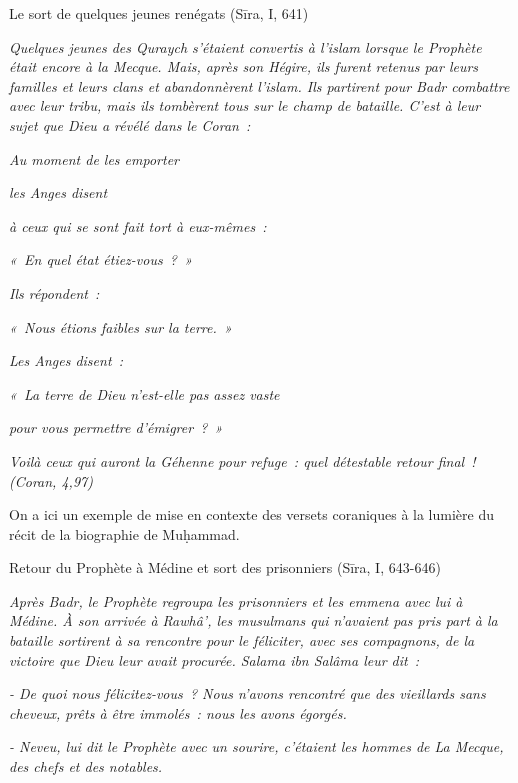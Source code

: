 Le sort de quelques jeunes renégats (Sīra, I, 641)

\emph{Quelques jeunes des Quraych s'étaient convertis à l'islam lorsque
le Prophète était encore à la Mecque. Mais, après son Hégire, ils furent
retenus par leurs familles et leurs clans et abandonnèrent l'islam. Ils
partirent pour Badr combattre avec leur tribu, mais ils tombèrent tous
sur le champ de bataille. C'est à leur sujet que Dieu a révélé dans le
Coran~:}

\emph{Au moment de les emporter}

\emph{les Anges disent}

\emph{à ceux qui se sont fait tort à eux-mêmes~:}

\emph{«~En quel état étiez-vous~?~»}

\emph{Ils répondent~:}

\emph{«~Nous étions faibles sur la terre.~»}

\emph{Les Anges disent~:}

\emph{«~La terre de Dieu n'est-elle pas assez vaste}

\emph{pour vous permettre d'émigrer~?~»}

\emph{Voilà ceux qui auront la Géhenne pour refuge~: quel détestable
retour final~! (Coran, 4,97)}

On a ici un exemple de mise en contexte des versets coraniques à la
lumière du récit de la biographie de Muḥammad.


Retour du Prophète à Médine et sort des prisonniers (Sīra, I, 643-646)

\emph{Après Badr, le Prophète regroupa les prisonniers et les emmena
avec lui à Médine. À son arrivée à Rawhâ', les musulmans qui n'avaient
pas pris part à la bataille sortirent à sa rencontre pour le féliciter,
avec ses compagnons, de la victoire que Dieu leur avait procurée. Salama
ibn Salâma leur dit~:}

\emph{- De quoi nous félicitez-vous~? Nous n'avons rencontré que des
vieillards sans cheveux, prêts à être immolés~: nous les avons égorgés.}

\emph{- Neveu, lui dit le Prophète avec un sourire, c'étaient les hommes
de La Mecque, des chefs et des notables.}

